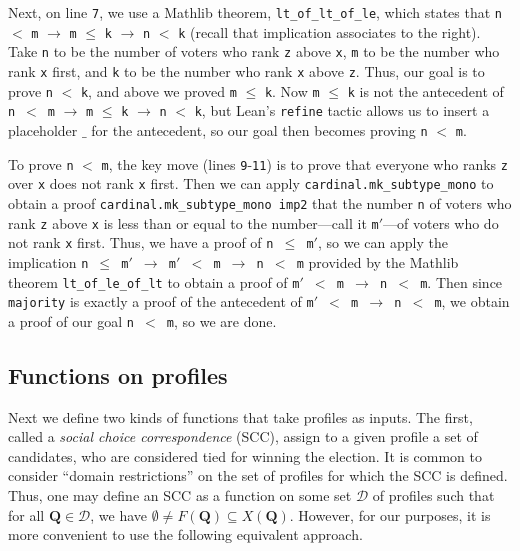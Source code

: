 \documentclass[runningheads]{llncs}
\begin{document}
Next, on line \texttt{7}, we use a Mathlib theorem, \texttt{lt\_of\_lt\_of\_le}, which states that \texttt{n} $<$ \texttt{m} $\to$ \texttt{m} $\leq$ \texttt{k} $\to$ \texttt{n} $<$ \texttt{k} (recall that implication associates to the right). Take \texttt{n} to be the number of voters who rank \texttt{z} above \texttt{x}, \texttt{m} to be the number who rank \texttt{x} first, and \texttt{k} to be the number  who rank \texttt{x} above \texttt{z}. Thus, our goal is to prove \texttt{n} $<$ \texttt{k}, and above we proved  \texttt{m} $\leq$ \texttt{k}. Now \texttt{m} $\leq$ \texttt{k} is not the antecedent of \texttt{n}~$<$~\texttt{m} $\to$ \texttt{m} $\leq$ \texttt{k} $\to$ \texttt{n} $<$ \texttt{k}, but Lean's \texttt{refine} tactic allows us to insert a placeholder $\_$ for the antecedent, so our goal then becomes proving  \texttt{n} $<$ \texttt{m}. 

To prove \texttt{n} $<$ \texttt{m}, the key move (lines \texttt{9}-\texttt{11}) is to prove that everyone who ranks \texttt{z} over \texttt{x} does not rank \texttt{x} first. Then we can apply \texttt{cardinal.mk\_subtype\_mono} to obtain a proof \texttt{cardinal.mk\_subtype\_mono imp2} that the number \texttt{n} of voters who rank \texttt{z} above \texttt{x} is less than or equal to the number---call it \texttt{m}$'$---of voters who do not rank \texttt{x} first. Thus, we have a proof of \texttt{n~$\leq$~m$'$}, so we can apply the implication  \texttt{n~$\leq$~m$'$ $\to$ m$'$  $<$ m $\to$ n $<$ m} provided by the Mathlib theorem \texttt{lt\_of\_le\_of\_lt} to obtain a proof of \texttt{m$'$  $<$ m $\to$ n $<$ m}. Then since \texttt{majority} is exactly a proof of the antecedent of \texttt{m$'$  $<$ m $\to$ n $<$ m}, we obtain a proof of our goal \texttt{n $<$ m}, so we are done.




\subsection{Functions on profiles}

Next we define two kinds of functions that take profiles as inputs. The first, called a \textit{social choice correspondence} (SCC), assign to a given profile a set of candidates, who are considered tied for winning the election. It is common to consider ``domain restrictions'' on the set of profiles for which the SCC is defined. Thus, one may define an SCC as a function on some set $\mathcal{D}$ of profiles such that for all $\mathbf{Q}\in\mathcal{D}$, we have ${\emptyset\neq F(\mathbf{Q})\subseteq X(\mathbf{Q})}$. However, for our purposes, it is more convenient to use the following equivalent approach.
\end{document}
